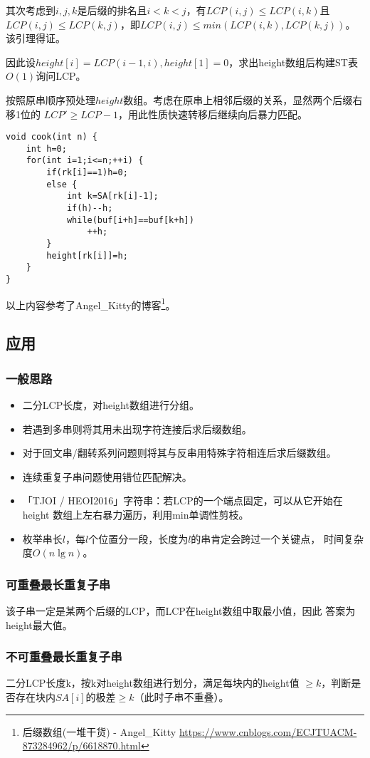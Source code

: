 其次考虑到$i,j,k$是后缀的排名且$i<k<j$，有$LCP(i,j)\leq LCP(i,k)$且
$LCP(i,j)\leq LCP(k,j)$，即$LCP(i,j)\leq min(LCP(i,k),LCP(k,j))$。
该引理得证。

因此设$height[i]=LCP(i-1,i),height[1]=0$，求出height数组后构建ST表$O(1)$询问LCP。

按照原串顺序预处理$height$数组。考虑在原串上相邻后缀的关系，显然两个后缀右移1位的
$LCP'\geq LCP-1$，用此性质快速转移后继续向后暴力匹配。

\begin{lstlisting}
void cook(int n) {
    int h=0;
    for(int i=1;i<=n;++i) {
        if(rk[i]==1)h=0;
        else {
            int k=SA[rk[i]-1];
            if(h)--h;
            while(buf[i+h]==buf[k+h])
                ++h;
        }
        height[rk[i]]=h;
    }
}
\end{lstlisting}
以上内容参考了Angel\_Kitty的博客\footnote{后缀数组(一堆干货) - Angel\_Kitty
    \url{https://www.cnblogs.com/ECJTUACM-873284962/p/6618870.html}
}。
\subsection{应用}
\subsubsection{一般思路}
\begin{itemize}
    \item 二分LCP长度，对height数组进行分组。
    \item 若遇到多串则将其用未出现字符连接后求后缀数组。
    \item 对于回文串/翻转系列问题则将其与反串用特殊字符相连后求后缀数组。
    \item 连续重复子串问题使用错位匹配解决。
    \item 「TJOI / HEOI2016」字符串：若LCP的一个端点固定，可以从它开始在height
    数组上左右暴力遍历，利用min单调性剪枝。
    \item 枚举串长$l$，每$l$个位置分一段，长度为$l$的串肯定会跨过一个关键点，
    时间复杂度$O(n\lg n)$。
\end{itemize}
\subsubsection{可重叠最长重复子串}
该子串一定是某两个后缀的LCP，而LCP在height数组中取最小值，因此
答案为height最大值。
\subsubsection{不可重叠最长重复子串}
二分LCP长度k，按k对height数组进行划分，满足每块内的height值
$\geq k$，判断是否存在块内$SA[i]$的极差$\geq k$（此时子串不重叠）。
